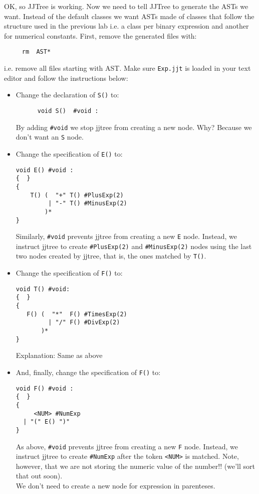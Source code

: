\documentclass{article}
\begin{document}
OK, so JJTree is working. Now we need to tell JJTree to generate the ASTs we want. Instead of the default classes we want ASTs made of classes that follow the structure used in the previous lab i.e. a class per binary expression and another for numerical constants. First, remove the generated files with:

\begin{verbatim}
     rm  AST*
\end{verbatim}

\noindent i.e. remove all files starting with AST. Make sure {\tt Exp.jjt} is loaded in your text editor and follow the instructions below:

\begin{itemize}
\item Change the declaration of {\tt S()} to:

\begin{verbatim}
      void S()  #void :
\end{verbatim}

By adding \verb+#void+ we stop jjtree from creating a new node. Why? Because we don't want an {\tt S} node.

\item Change the specification of {\tt E()} to:

\begin{verbatim}
void E() #void :
{  }
{
    T() (  "+" T() #PlusExp(2)
         | "-" T() #MinusExp(2)
        )*
}
\end{verbatim}

Similarly, \verb+#void+ prevents jjtree from creating a new {\tt E} node. Instead, we instruct jjtree to create \verb+#PlusExp(2)+ and \verb+#MinusExp(2)+ nodes using the last two nodes created by jjtree, that is, the ones matched by {\tt T()}.

\item Change the specification of {\tt F()} to:

\begin{verbatim}
void T() #void:
{  }
{
   F() (  "*"  F() #TimesExp(2) 
         | "/" F() #DivExp(2) 
       )*
}
\end{verbatim}

Explanation: Same as above

\item And, finally, change the specification of {\tt F()} to:

\begin{verbatim}
void F() #void :
{  }
{
     <NUM> #NumExp
  | "(" E() ")"
}
\end{verbatim}

As above, \verb+#void+ prevents jjtree from creating a new {\tt F} node. Instead, we instruct jjtree to create \verb+#NumExp+ after the token \verb+<NUM>+ is matched. Note, however, that we are not storing the numeric value of the number!! (we'll sort that out soon). \\
We don't need to create a new node for expression in parenteses.

\end{itemize}
\end{document}
